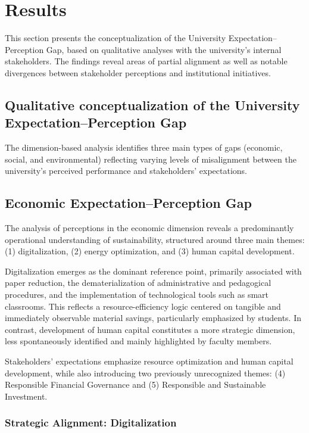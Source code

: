 \documentclass[12pt,a4paper]{article}
\begin{document}
\section{Results}

This section presents the conceptualization of the University Expectation--Perception Gap, based on qualitative analyses with the university’s internal stakeholders. The findings reveal areas of partial alignment as well as notable divergences between stakeholder perceptions and institutional initiatives.

\subsection{Qualitative conceptualization of the University Expectation--Perception Gap}

The dimension-based analysis identifies three main types of gaps (economic, social, and environmental) reflecting varying levels of misalignment between the university’s perceived performance and stakeholders’ expectations.

\subsection{Economic Expectation--Perception Gap}

The analysis of perceptions in the economic dimension reveals a predominantly operational understanding of sustainability, structured around three main themes: (1) digitalization, (2) energy optimization, and (3) human capital development.

Digitalization emerges as the dominant reference point, primarily associated with paper reduction, the dematerialization of administrative and pedagogical procedures, and the implementation of technological tools such as smart classrooms. This reflects a resource-efficiency logic centered on tangible and immediately observable material savings, particularly emphasized by students. In contrast, development of human capital constitutes a more strategic dimension, less spontaneously identified and mainly highlighted by faculty members.

Stakeholders’ expectations emphasize resource optimization and human capital development, while also introducing two previously unrecognized themes: (4) Responsible Financial Governance and (5) Responsible and Sustainable Investment.

\subsubsection{Strategic Alignment: Digitalization}
\end{document}

